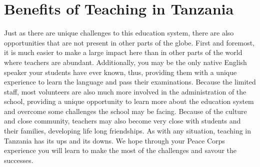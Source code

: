 \section{Benefits of Teaching in Tanzania}
Just as there are unique challenges to this education system, there are also opportunities that are not present in other parts of the globe.  First and foremost, it is much easier to make a large impact here than in other parts of the world where teachers are abundant. Additionally, you may be the only native English speaker your students have ever known, thus, providing them with a unique experience to learn the language and pass their examinations.  Because the limited staff, most volunteers are also much more involved in the administration of the school, providing a unique opportunity to learn more about the education system and overcome some challenges the school may be facing.  Because of the culture and close community, teachers may also become very close with students and their families, developing life long friendships.  As with any situation, teaching in Tanzania has its ups and its downs.  We hope through your Peace Corps experience you will learn to make the most of the challenges and savour the successes.  

